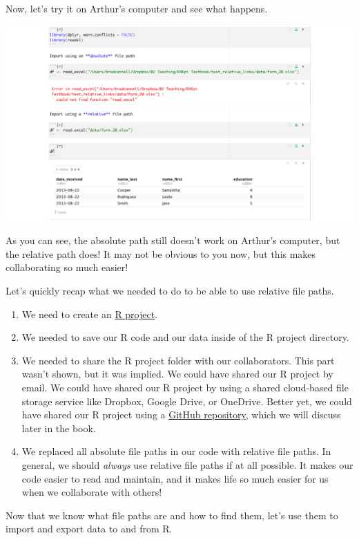 \documentclass[
  letterpaper,
  DIV=11,
  numbers=noendperiod]{scrreprt}
\begin{document}
Now, let's try it on Arthur's computer and see what happens.

\includegraphics{chapters/file_paths/relative_file_paths_06_relative_path_arthur.png}

As you can see, the absolute path still doesn't work on Arthur's
computer, but the relative path does! It may not be obvious to you now,
but this makes collaborating so much easier!

Let's quickly recap what we needed to do to be able to use relative file
paths.

\begin{enumerate}
\def\labelenumi{\arabic{enumi}.}
\item
  We need to create an \href{../r_projects/projects.qmd}{R project}.
\item
  We needed to save our R code and our data inside of the R project
  directory.
\item
  We needed to share the R project folder with our collaborators. This
  part wasn't shown, but it was implied. We could have shared our R
  project by email. We could have shared our R project by using a shared
  cloud-based file storage service like Dropbox, Google Drive, or
  OneDrive. Better yet, we could have shared our R project using a
  \href{Introduction\%20to\%20git\%20and\%20GitHub}{GitHub repository},
  which we will discuss later in the book.
\item
  We replaced all absolute file paths in our code with relative file
  paths. In general, we should \emph{always} use relative file paths if
  at all possible. It makes our code easier to read and maintain, and it
  makes life so much easier for us when we collaborate with others!
\end{enumerate}

Now that we know what file paths are and how to find them, let's use
them to import and export data to and from R.
\end{document}
